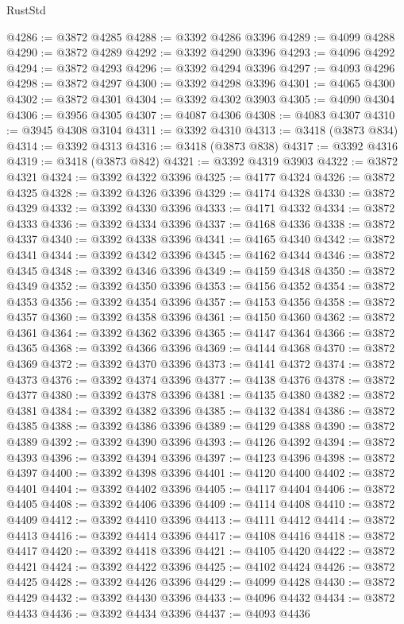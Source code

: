 \begin{lexlean}{RustStd}
\begin{coremodule}
@4286 := @3872 @4285
@4288 := @3392 @4286 @3396
@4289 := @4099 @4288
@4290 := @3872 @4289
@4292 := @3392 @4290 @3396
@4293 := @4096 @4292
@4294 := @3872 @4293
@4296 := @3392 @4294 @3396
@4297 := @4093 @4296
@4298 := @3872 @4297
@4300 := @3392 @4298 @3396
@4301 := @4065 @4300
@4302 := @3872 @4301
@4304 := @3392 @4302 @3903
@4305 := @4090 @4304
@4306 := @3956 @4305
@4307 := @4087 @4306
@4308 := @4083 @4307
@4310 := @3945 @4308 @3104
@4311 := @3392 @4310
@4313 := @3418 (@3873 @834)
@4314 := @3392 @4313
@4316 := @3418 (@3873 @838)
@4317 := @3392 @4316
@4319 := @3418 (@3873 @842)
@4321 := @3392 @4319 @3903
@4322 := @3872 @4321
@4324 := @3392 @4322 @3396
@4325 := @4177 @4324
@4326 := @3872 @4325
@4328 := @3392 @4326 @3396
@4329 := @4174 @4328
@4330 := @3872 @4329
@4332 := @3392 @4330 @3396
@4333 := @4171 @4332
@4334 := @3872 @4333
@4336 := @3392 @4334 @3396
@4337 := @4168 @4336
@4338 := @3872 @4337
@4340 := @3392 @4338 @3396
@4341 := @4165 @4340
@4342 := @3872 @4341
@4344 := @3392 @4342 @3396
@4345 := @4162 @4344
@4346 := @3872 @4345
@4348 := @3392 @4346 @3396
@4349 := @4159 @4348
@4350 := @3872 @4349
@4352 := @3392 @4350 @3396
@4353 := @4156 @4352
@4354 := @3872 @4353
@4356 := @3392 @4354 @3396
@4357 := @4153 @4356
@4358 := @3872 @4357
@4360 := @3392 @4358 @3396
@4361 := @4150 @4360
@4362 := @3872 @4361
@4364 := @3392 @4362 @3396
@4365 := @4147 @4364
@4366 := @3872 @4365
@4368 := @3392 @4366 @3396
@4369 := @4144 @4368
@4370 := @3872 @4369
@4372 := @3392 @4370 @3396
@4373 := @4141 @4372
@4374 := @3872 @4373
@4376 := @3392 @4374 @3396
@4377 := @4138 @4376
@4378 := @3872 @4377
@4380 := @3392 @4378 @3396
@4381 := @4135 @4380
@4382 := @3872 @4381
@4384 := @3392 @4382 @3396
@4385 := @4132 @4384
@4386 := @3872 @4385
@4388 := @3392 @4386 @3396
@4389 := @4129 @4388
@4390 := @3872 @4389
@4392 := @3392 @4390 @3396
@4393 := @4126 @4392
@4394 := @3872 @4393
@4396 := @3392 @4394 @3396
@4397 := @4123 @4396
@4398 := @3872 @4397
@4400 := @3392 @4398 @3396
@4401 := @4120 @4400
@4402 := @3872 @4401
@4404 := @3392 @4402 @3396
@4405 := @4117 @4404
@4406 := @3872 @4405
@4408 := @3392 @4406 @3396
@4409 := @4114 @4408
@4410 := @3872 @4409
@4412 := @3392 @4410 @3396
@4413 := @4111 @4412
@4414 := @3872 @4413
@4416 := @3392 @4414 @3396
@4417 := @4108 @4416
@4418 := @3872 @4417
@4420 := @3392 @4418 @3396
@4421 := @4105 @4420
@4422 := @3872 @4421
@4424 := @3392 @4422 @3396
@4425 := @4102 @4424
@4426 := @3872 @4425
@4428 := @3392 @4426 @3396
@4429 := @4099 @4428
@4430 := @3872 @4429
@4432 := @3392 @4430 @3396
@4433 := @4096 @4432
@4434 := @3872 @4433
@4436 := @3392 @4434 @3396
@4437 := @4093 @4436

\end{coremodule}
\end{lexlean}

